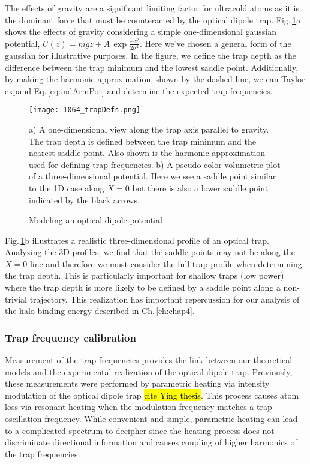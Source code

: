 The effects of gravity are a significant limiting factor for ultracold atoms as it is the dominant force that must be counteracted by the optical dipole trap.
Fig.\,\ref{fig:trapDepth}a shows the effects of gravity considering a simple one-dimensional gaussian potential, $U(z) = mgz + A\,\exp{\frac{-z^2}{2\sigma^2}}$.
Here we've chosen a general form of the gaussian for illustrative purposes.
In the figure, we define the trap depth as the difference between the trap minimum and the lowest saddle point.
Additionally, by making the harmonic approximation, shown by the dashed line, we can Taylor expand Eq.\,\ref{eq:indArmPot} and determine the expected trap frequencies.
	\begin{figure} 
		\centerline{
		\texttt{[image: 1064\_trapDefs.png]}}
		\caption{Modeling an optical dipole potential}{a) A one-dimensional view along the trap axis parallel to gravity. The trap depth is defined between the trap minimum and the nearest saddle point. Also shown is the harmonic approximation used for defining trap frequencies. b) A pseudo-color volumetric plot of a three-dimensional potential. Here we see a saddle point similar to the 1D case along $X=0$ but there is also a lower saddle point indicated by the black arrows.}
		\label{fig:trapDepth}
	\end{figure}
Fig.\,\ref{fig:trapDepth}b illustrates a realistic three-dimensional profile of an optical trap.
Analyzing the 3D profiles, we find that the saddle points may not be along the $X=0$ line and therefore we must consider the full trap profile when determining the trap depth.
This is particularly important for shallow traps (low power) where the trap depth is more likely to be defined by a saddle point along a non-trivial trajectory.
This realization has important repercussion for our analysis of the halo binding energy described in Ch.\,\ref{ch:chap4}.

\subsubsection{Trap frequency calibration} \label{sssec:1064_trap_freq}
Measurement of the trap frequencies provides the link between our theoretical models and the experimental realization of the optical dipole trap.
Previously, these measurements were performed by parametric heating via intensity modulation of the optical dipole trap \hl{cite Ying thesis}. 
This process causes atom loss via resonant heating when the modulation frequency matches a trap oscillation frequency. 
While convenient and simple, parametric heating can lead to a complicated spectrum to decipher since the heating process does not discriminate directional information and causes coupling of higher harmonics of the trap frequencies. 


